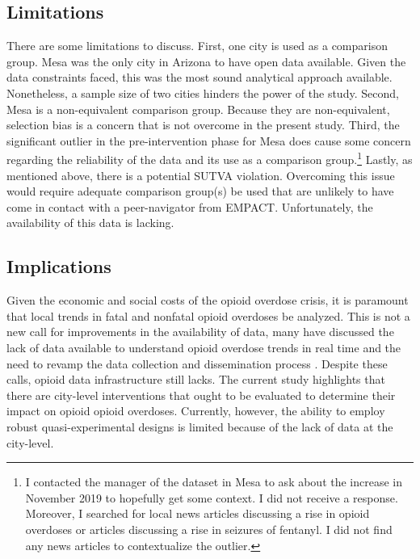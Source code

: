 \subsection{Limitations}
There are some limitations to discuss. First, one city is used as a comparison group. Mesa was the only city in Arizona to have open data available. Given the data constraints faced, this was the most sound analytical approach available. Nonetheless, a sample size of two cities hinders the power of the study. Second, Mesa is a non-equivalent comparison group. Because they are non-equivalent, selection bias is a concern that is not overcome in the present study. Third, the significant outlier in the pre-intervention phase for Mesa does cause some concern regarding the reliability of the data and its use as a comparison group.\footnote{I contacted the manager of the dataset in Mesa to ask about the increase in November 2019 to hopefully get some context. I did not receive a response. Moreover, I searched for local news articles discussing a rise in opioid overdoses or articles discussing a rise in seizures of fentanyl. I did not find any news articles to contextualize the outlier.} Lastly, as mentioned above, there is a potential SUTVA violation. Overcoming this issue would require adequate comparison group(s) be used that are unlikely to have come in contact with a peer-navigator from EMPACT. Unfortunately, the availability of this data is lacking.

\subsection{Implications}
Given the economic and social costs of the opioid overdose crisis, it is paramount that local trends in fatal and nonfatal opioid overdoses be analyzed. This is not a new call for improvements in the availability of data, many have discussed the lack of data available to understand opioid overdose trends in real time and the need to revamp the data collection and dissemination process \parencite{blanco_data_2022, volkow_need_2022}. Despite these calls, opioid data infrastructure still lacks. The current study highlights that there are city-level interventions that ought to be evaluated to determine their impact on opioid opioid overdoses. Currently, however, the ability to employ robust quasi-experimental designs is limited because of the lack of data at the city-level. 

